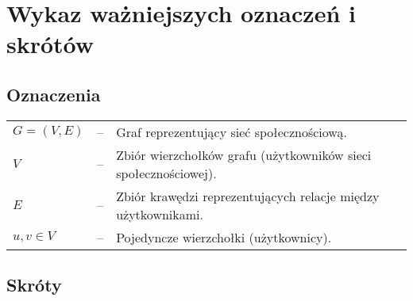 \chapter*{Wykaz ważniejszych oznaczeń i skrótów}

\section*{Oznaczenia}

\begin{tabular}{@{} l l p{} @{}}
    $G = (V,E)$  & -- & Graf reprezentujący sieć społecznościową. \\
    $V$          & -- & Zbiór wierzchołków grafu (użytkowników sieci społecznościowej). \\
    $E$          & -- & Zbiór krawędzi reprezentujących relacje między użytkownikami. \\
    $u, v \in V$ & -- & Pojedyncze wierzchołki (użytkownicy). \\
\end{tabular}

\section*{Skróty}


